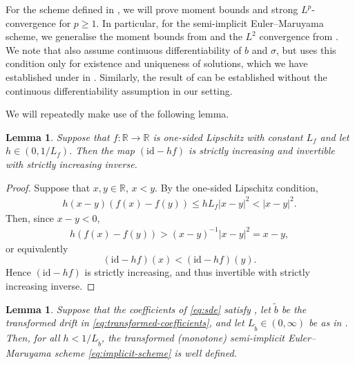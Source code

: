 \documentclass[onseside, final]{amsart}
\newtheorem{lemma}[theorem]{Lemma}
\theoremstyle{definition}
\newcommand{\R}{\mathbb R}
\newcommand{\id}{\mathrm{id}}
\numberwithin{equation}{section}
\begin{document}
		For the scheme defined in , we will prove moment bounds and strong $L^p$-convergence for $p \ge 1$. In particular, for the semi-implicit Euler--Maruyama scheme, we generalise the moment bounds from \citet{HiMaSt02} and the $L^2$ convergence from \citet{Hu96}. We note that \citep{Hu96,HiMaSt02} also assume continuous differentiability of $b$ and $\sigma$, but \cite{Hu96} uses this condition only for existence and uniqueness of solutions, which we have established under  in . Similarly, the result of \cite{HiMaSt02} can be established without the continuous differentiability assumption in our setting.
		
		We will repeatedly make use of the following lemma.
		
		\begin{lemma}\label{lem:invertible-implicit}
			Suppose that $f \colon \R \to \R$ is one-sided Lipschitz with constant $L_f$ and let $h \in (0, 1/L_f)$. Then the map $(\id - h f)$ is strictly increasing and invertible with strictly increasing inverse.
		\end{lemma}
		
		\begin{proof}
			Suppose that $x, y \in \R$, $x < y$. By the one-sided Lipschitz condition,
			\begin{equation}
				\begin{split}
					h (x - y)(f(x) - f(y)) \leq h L_f |x - y|^2 < |x - y|^2.
				\end{split}
			\end{equation}
			Then, since $x - y < 0$,
			\begin{equation}
				\begin{split}
					h (f(x) - f(y)) > (x - y)^{-1}|x - y|^2 = x - y,
				\end{split}
			\end{equation}
			or equivalently
			\begin{equation}
				(\id - h f)(x) < (\id - h f)(y).
			\end{equation}
			Hence $(\id - h f)$ is strictly increasing, and thus invertible with strictly increasing inverse.
		\end{proof}
		
		\begin{lemma}\label{well-defined-transf-implicit}
			Suppose that the coefficients of \eqref{eq:sde} satisfy , let $\tilde b$ be the transformed drift in \eqref{eq:transformed-coefficients}, and let $L_{\tilde b} \in (0, \infty)$ be as in . Then, for all $h < 1/L_{\tilde b}$, the transformed (monotone) semi-implicit Euler--Maruyama scheme \eqref{eq:implicit-scheme} is well defined.
		\end{lemma}
		
\end{document}
